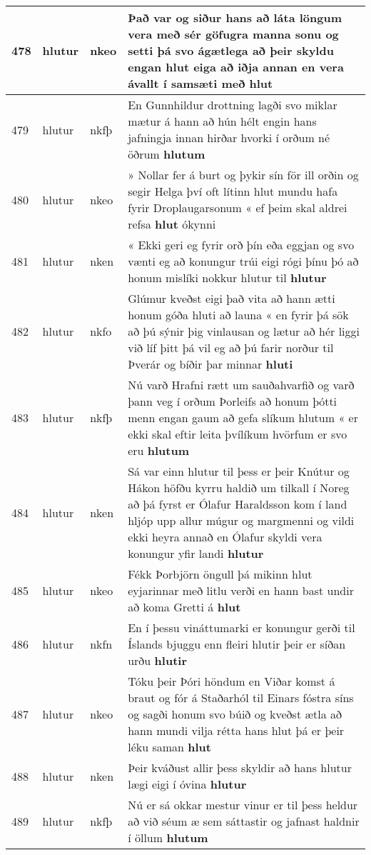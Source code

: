 \documentclass{article}
\begin{document}
\begin{longtable}{p{1cm}|p{1cm}|p{1cm}|p{13cm}}
\hline
478&hlutur&nkeo&Það var og siður hans að láta löngum vera með sér göfugra manna sonu og setti þá svo ágætlega að þeir skyldu engan hlut eiga að iðja annan en vera ávallt í samsæti með \textbf{hlut} \\
\hline
479&hlutur&nkfþ&En Gunnhildur drottning lagði svo miklar mætur á hann að hún hélt engin hans jafningja innan hirðar hvorki í orðum né öðrum \textbf{hlutum} \\
\hline
480&hlutur&nkeo&» Nollar fer á burt og þykir sín för ill orðin og segir Helga því oft lítinn hlut mundu hafa fyrir Droplaugarsonum « ef þeim skal aldrei refsa \textbf{hlut} ókynni\\
\hline
481&hlutur&nken&« Ekki geri eg fyrir orð þín eða eggjan og svo vænti eg að konungur trúi eigi rógi þínu þó að honum mislíki nokkur hlutur til \textbf{hlutur} \\
\hline
482&hlutur&nkfo&Glúmur kveðst eigi það vita að hann ætti honum góða hluti að launa « en fyrir þá sök að þú sýnir þig vinlausan og lætur að hér liggi við líf þitt þá vil eg að þú farir norður til Þverár og bíðir þar minnar \textbf{hluti} \\
\hline
483&hlutur&nkfþ&Nú varð Hrafni rætt um sauðahvarfið og varð þann veg í orðum Þorleifs að honum þótti menn engan gaum að gefa slíkum hlutum « er ekki skal eftir leita þvílíkum hvörfum er svo eru \textbf{hlutum} \\
\hline
484&hlutur&nken&Sá var einn hlutur til þess er þeir Knútur og Hákon höfðu kyrru haldið um tilkall í Noreg að þá fyrst er Ólafur Haraldsson kom í land hljóp upp allur múgur og margmenni og vildi ekki heyra annað en Ólafur skyldi vera konungur yfir landi \textbf{hlutur} \\
\hline
485&hlutur&nkeo&Fékk Þorbjörn öngull þá mikinn hlut eyjarinnar með litlu verði en hann bast undir að koma Gretti á \textbf{hlut} \\
\hline
486&hlutur&nkfn&En í þessu vináttumarki er konungur gerði til Íslands bjuggu enn fleiri hlutir þeir er síðan urðu \textbf{hlutir} \\
\hline
487&hlutur&nkeo&Tóku þeir Þóri höndum en Viðar komst á braut og fór á Staðarhól til Einars fóstra síns og sagði honum svo búið og kveðst ætla að hann mundi vilja rétta hans hlut þá er þeir léku saman \textbf{hlut} \\
\hline
488&hlutur&nken&Þeir kváðust allir þess skyldir að hans hlutur lægi eigi í óvina \textbf{hlutur} \\
\hline
489&hlutur&nkfþ&Nú er sá okkar mestur vinur er til þess heldur að við séum æ sem sáttastir og jafnast haldnir í öllum \textbf{hlutum} \\

\end{longtable}
\end{document}
